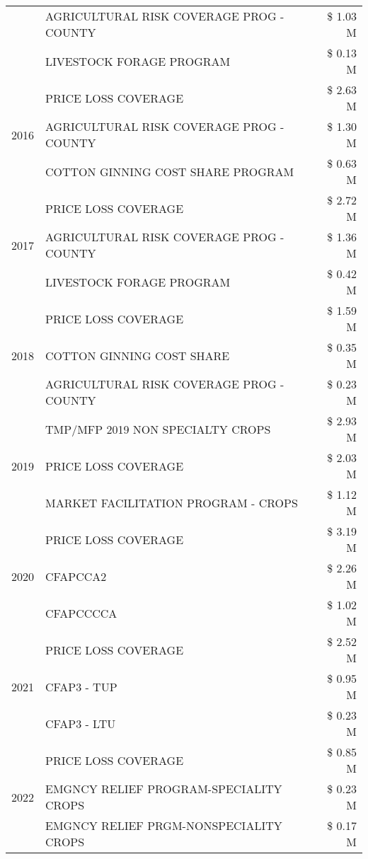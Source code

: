 \begin{tabular}{llr}
 & AGRICULTURAL RISK COVERAGE PROG - COUNTY & \$ 1.03 M \\
 & LIVESTOCK FORAGE PROGRAM & \$ 0.13 M \\
\cline{1-3}
\multirow[t]{3}{*}{2016} & PRICE LOSS COVERAGE & \$ 2.63 M \\
 & AGRICULTURAL RISK COVERAGE PROG - COUNTY & \$ 1.30 M \\
 & COTTON GINNING COST SHARE PROGRAM & \$ 0.63 M \\
\cline{1-3}
\multirow[t]{3}{*}{2017} & PRICE LOSS COVERAGE & \$ 2.72 M \\
 & AGRICULTURAL RISK COVERAGE PROG - COUNTY & \$ 1.36 M \\
 & LIVESTOCK FORAGE PROGRAM & \$ 0.42 M \\
\cline{1-3}
\multirow[t]{3}{*}{2018} & PRICE LOSS COVERAGE & \$ 1.59 M \\
 & COTTON GINNING COST SHARE & \$ 0.35 M \\
 & AGRICULTURAL RISK COVERAGE PROG - COUNTY & \$ 0.23 M \\
\cline{1-3}
\multirow[t]{3}{*}{2019} & TMP/MFP 2019 NON SPECIALTY CROPS & \$ 2.93 M \\
 & PRICE LOSS COVERAGE & \$ 2.03 M \\
 & MARKET FACILITATION PROGRAM - CROPS & \$ 1.12 M \\
\cline{1-3}
\multirow[t]{3}{*}{2020} & PRICE LOSS COVERAGE & \$ 3.19 M \\
 & CFAPCCA2 & \$ 2.26 M \\
 & CFAPCCCCA & \$ 1.02 M \\
\cline{1-3}
\multirow[t]{3}{*}{2021} & PRICE LOSS COVERAGE & \$ 2.52 M \\
 & CFAP3 - TUP & \$ 0.95 M \\
 & CFAP3 - LTU & \$ 0.23 M \\
\cline{1-3}
\multirow[t]{3}{*}{2022} & PRICE LOSS COVERAGE & \$ 0.85 M \\
 & EMGNCY RELIEF PROGRAM-SPECIALITY CROPS & \$ 0.23 M \\
 & EMGNCY RELIEF PRGM-NONSPECIALITY CROPS & \$ 0.17 M \\
\cline{1-3}
\bottomrule
\end{tabular}
